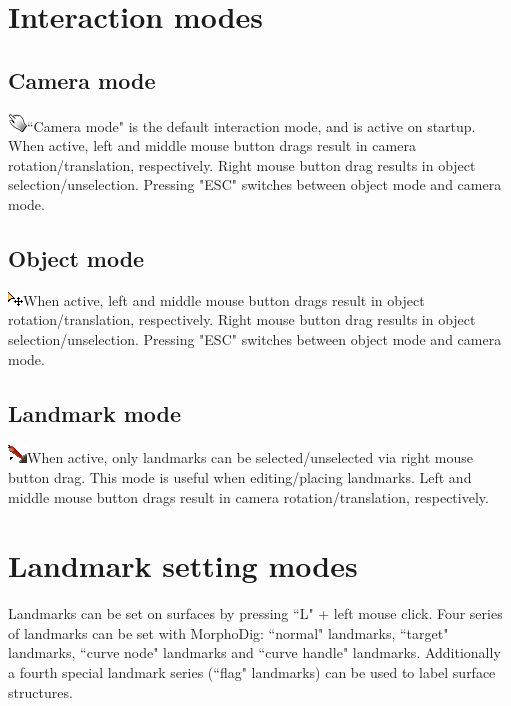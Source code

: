\section{Interaction modes}


\subsection{Camera mode}
  \includegraphics[scale=0.7]{images/04/camera_mode.png}``Camera mode" is the default interaction mode, and is active on startup. When active, left and middle mouse button drags result in camera rotation/translation, respectively. Right mouse button drag results in object selection/unselection. Pressing "ESC" switches between object mode and camera mode.
\subsection{Object mode}
   \includegraphics[scale=0.7]{images/04/move_mode.png}When active, left and middle mouse button drags result in object rotation/translation, respectively. Right mouse button drag results in object selection/unselection. Pressing "ESC" switches between object mode and camera mode.
\subsection{Landmark mode}
  \includegraphics[scale=0.7]{images/04/Landmarks2.png}When active, only landmarks can be selected/unselected via right mouse button drag. This mode is useful when editing/placing landmarks. Left and middle mouse button drags result in camera rotation/translation, respectively.

\section{Landmark setting modes}
Landmarks can be set on surfaces by pressing ``L" + left mouse click. 
Four series of landmarks can be set with MorphoDig: ``normal" landmarks, ``target" landmarks, ``curve node" landmarks and ``curve handle" landmarks. Additionally a fourth special landmark series (``flag" landmarks) can be used to label surface structures. 


